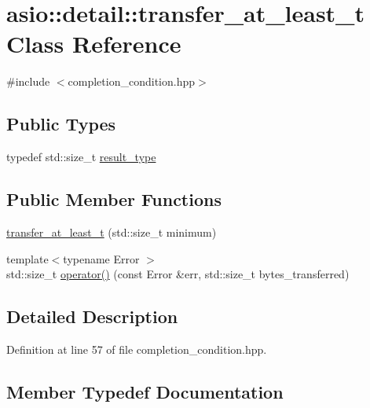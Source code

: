 \hypertarget{classasio_1_1detail_1_1transfer__at__least__t}{}\section{asio\+:\+:detail\+:\+:transfer\+\_\+at\+\_\+least\+\_\+t Class Reference}
\label{classasio_1_1detail_1_1transfer__at__least__t}


{\ttfamily \#include $<$completion\+\_\+condition.\+hpp$>$}

\subsection*{Public Types}
\begin{DoxyCompactItemize}
\item 
typedef std\+::size\+\_\+t \hyperlink{classasio_1_1detail_1_1transfer__at__least__t_a5cf3de33becdd273cb313776bea6e5d9}{result\+\_\+type}
\end{DoxyCompactItemize}
\subsection*{Public Member Functions}
\begin{DoxyCompactItemize}
\item 
\hyperlink{classasio_1_1detail_1_1transfer__at__least__t_aa7138468203b5518c8f2853be0d84ed1}{transfer\+\_\+at\+\_\+least\+\_\+t} (std\+::size\+\_\+t minimum)
\item 
{\footnotesize template$<$typename Error $>$ }\\std\+::size\+\_\+t \hyperlink{classasio_1_1detail_1_1transfer__at__least__t_abb2a64a87a9978fcd381aeeb0f77ef9d}{operator()} (const Error \&err, std\+::size\+\_\+t bytes\+\_\+transferred)
\end{DoxyCompactItemize}


\subsection{Detailed Description}


Definition at line 57 of file completion\+\_\+condition.\+hpp.



\subsection{Member Typedef Documentation}
\hypertarget{classasio_1_1detail_1_1transfer__at__least__t_a5cf3de33becdd273cb313776bea6e5d9}{}
